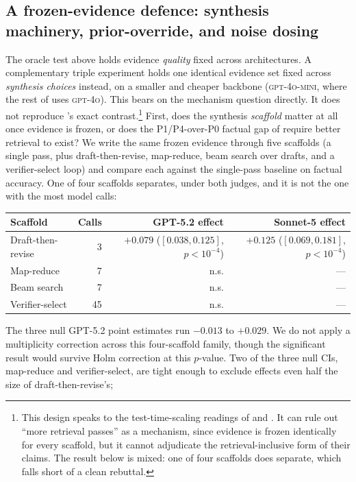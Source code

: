 \documentclass[11pt]{article}
\begin{document}
\subsection{A frozen-evidence defence: synthesis machinery, prior-override, and noise dosing}\label{sec:frozendefence}
The oracle test above holds evidence \emph{quality} fixed across architectures. A
complementary triple experiment holds one identical evidence set fixed across
\emph{synthesis choices} instead, on a smaller and cheaper backbone (\textsc{gpt-4o-mini},
where the rest of  uses \textsc{gpt-4o}). This bears on the mechanism
question directly. It does not reproduce 's exact contrast.\footnote{This
design speaks to the test-time-scaling readings of
\citet{argus2026} and \citet{ttddr2025}. It can rule out ``more retrieval passes'' as a
mechanism, since evidence is frozen identically for every scaffold, but it cannot adjudicate
the retrieval-inclusive form of their claims. The result below is mixed: one of four scaffolds
does separate, which falls short of a clean rebuttal.} First, does the synthesis \emph{scaffold}
matter at all once evidence is
frozen, or does the P1/P4-over-P0 factual gap of  require better retrieval
to exist? We write the same frozen evidence through five scaffolds (a single pass, plus
draft-then-revise, map-reduce, beam search over drafts, and a verifier-select loop) and
compare each against the single-pass baseline on factual accuracy. One of four scaffolds
separates, under both judges, and it is not the one with the most model calls:
\begin{center}
\small
\begin{tabular}{lrrr}
\toprule
Scaffold & Calls & GPT-5.2 effect & Sonnet-5 effect \\
\midrule
Draft-then-revise & 3 & $+0.079$ ($[0.038, 0.125]$, $p<10^{-4}$) & $+0.125$ ($[0.069, 0.181]$, $p<10^{-4}$) \\
Map-reduce & 7 & n.s. & --- \\
Beam search & 7 & n.s. & --- \\
Verifier-select & 45 & n.s. & --- \\
\bottomrule
\end{tabular}
\end{center}
The three null GPT-5.2 point estimates run $-0.013$ to $+0.029$. We do not apply a
multiplicity correction across this four-scaffold family, though the significant result would
survive Holm correction at this $p$-value. Two of the three null CIs, map-reduce and
verifier-select, are tight enough to exclude effects even half the size of draft-then-revise's;
\end{document}
